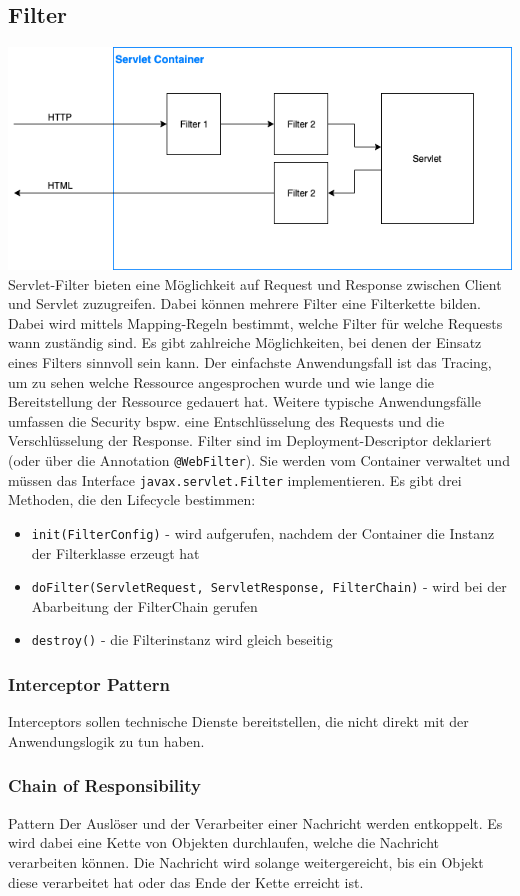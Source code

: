 \subsection{Filter}
\includegraphics[width=\columnwidth]{images/filter}
Servlet-Filter bieten eine Möglichkeit auf Request und Response zwischen Client und Servlet zuzugreifen. Dabei können mehrere Filter eine Filterkette bilden. Dabei wird mittels Mapping-Regeln bestimmt, welche Filter für welche Requests wann zuständig sind. Es gibt zahlreiche Möglichkeiten, bei denen der Einsatz eines Filters sinnvoll sein kann. Der einfachste Anwendungsfall ist das Tracing, um zu sehen welche Ressource angesprochen wurde und wie lange die Bereitstellung der Ressource gedauert hat. Weitere typische Anwendungsfälle umfassen die Security bspw. eine Entschlüsselung des Requests und die Verschlüsselung der Response. Filter sind im Deployment-Descriptor deklariert (oder über die Annotation \texttt{@WebFilter}). Sie werden vom Container verwaltet und müssen das Interface \texttt{javax.servlet.Filter} implementieren. Es gibt drei Methoden, die den Lifecycle bestimmen: 
\begin{itemize}
\item \texttt{init(FilterConfig)} - wird aufgerufen, nachdem der Container die Instanz der Filterklasse erzeugt hat
\item \texttt{doFilter(ServletRequest, ServletResponse, FilterChain)} - wird bei der Abarbeitung der FilterChain gerufen 
\item \texttt{destroy()} - die Filterinstanz wird gleich beseitig
\end{itemize}
\subsubsection{Interceptor Pattern}
Interceptors sollen technische Dienste bereitstellen, die nicht direkt mit der Anwendungslogik zu tun haben.

\subsubsection{Chain of Responsibility}
Pattern Der Auslöser und der Verarbeiter einer Nachricht werden entkoppelt. Es wird dabei eine Kette von Objekten durchlaufen, welche die Nachricht verarbeiten können. Die Nachricht wird solange weitergereicht, bis ein Objekt diese verarbeitet hat oder das Ende der Kette erreicht ist.
